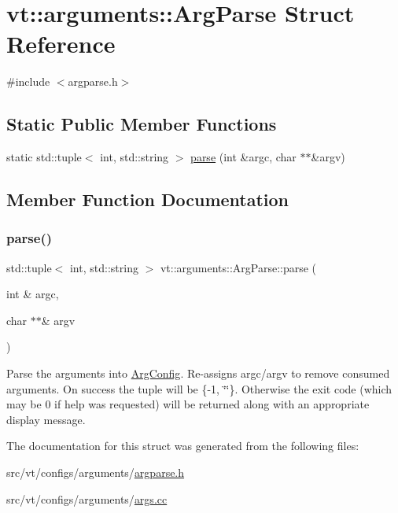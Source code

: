 \hypertarget{structvt_1_1arguments_1_1_arg_parse}{}\section{vt\+:\+:arguments\+:\+:Arg\+Parse Struct Reference}
\label{structvt_1_1arguments_1_1_arg_parse}


{\ttfamily \#include $<$argparse.\+h$>$}

\subsection*{Static Public Member Functions}
\begin{DoxyCompactItemize}
\item 
static std\+::tuple$<$ int, std\+::string $>$ \hyperlink{structvt_1_1arguments_1_1_arg_parse_aa52644ac4285c8ad995379964cf38983}{parse} (int \&argc, char $\ast$$\ast$\&argv)
\end{DoxyCompactItemize}


\subsection{Member Function Documentation}
\mbox{\label{structvt_1_1arguments_1_1_arg_parse_aa52644ac4285c8ad995379964cf38983}} 
\subsubsection{\texorpdfstring{parse()}{parse()}}
{\footnotesize\ttfamily std\+::tuple$<$ int, std\+::string $>$ vt\+::arguments\+::\+Arg\+Parse\+::parse (\begin{DoxyParamCaption}\item[{int \&}]{argc,  }\item[{char $\ast$$\ast$\&}]{argv }\end{DoxyParamCaption})\hspace{0.3cm}{\ttfamily [static]}}

Parse the arguments into \hyperlink{structvt_1_1arguments_1_1_arg_config}{Arg\+Config}. Re-\/assigns argc/argv to remove consumed arguments. On success the tuple will be \{-\/1, \char`\"{}\char`\"{}\}. Otherwise the exit code (which may be 0 if help was requested) will be returned along with an appropriate display message. 

The documentation for this struct was generated from the following files\+:\begin{DoxyCompactItemize}
\item 
src/vt/configs/arguments/\hyperlink{argparse_8h}{argparse.\+h}\item 
src/vt/configs/arguments/\hyperlink{args_8cc}{args.\+cc}\end{DoxyCompactItemize}
